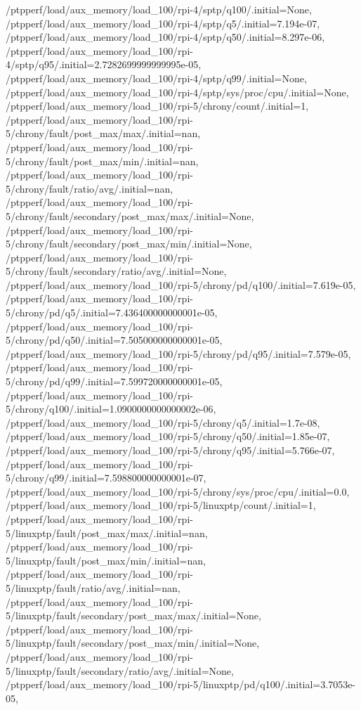 {    /ptpperf/load/aux_memory/load_100/rpi-4/sptp/q100/.initial=None,
    /ptpperf/load/aux_memory/load_100/rpi-4/sptp/q5/.initial=7.194e-07,
    /ptpperf/load/aux_memory/load_100/rpi-4/sptp/q50/.initial=8.297e-06,
    /ptpperf/load/aux_memory/load_100/rpi-4/sptp/q95/.initial=2.7282699999999995e-05,
    /ptpperf/load/aux_memory/load_100/rpi-4/sptp/q99/.initial=None,
    /ptpperf/load/aux_memory/load_100/rpi-4/sptp/sys/proc/cpu/.initial=None,
    /ptpperf/load/aux_memory/load_100/rpi-5/chrony/count/.initial=1,
    /ptpperf/load/aux_memory/load_100/rpi-5/chrony/fault/post_max/max/.initial=nan,
    /ptpperf/load/aux_memory/load_100/rpi-5/chrony/fault/post_max/min/.initial=nan,
    /ptpperf/load/aux_memory/load_100/rpi-5/chrony/fault/ratio/avg/.initial=nan,
    /ptpperf/load/aux_memory/load_100/rpi-5/chrony/fault/secondary/post_max/max/.initial=None,
    /ptpperf/load/aux_memory/load_100/rpi-5/chrony/fault/secondary/post_max/min/.initial=None,
    /ptpperf/load/aux_memory/load_100/rpi-5/chrony/fault/secondary/ratio/avg/.initial=None,
    /ptpperf/load/aux_memory/load_100/rpi-5/chrony/pd/q100/.initial=7.619e-05,
    /ptpperf/load/aux_memory/load_100/rpi-5/chrony/pd/q5/.initial=7.436400000000001e-05,
    /ptpperf/load/aux_memory/load_100/rpi-5/chrony/pd/q50/.initial=7.505000000000001e-05,
    /ptpperf/load/aux_memory/load_100/rpi-5/chrony/pd/q95/.initial=7.579e-05,
    /ptpperf/load/aux_memory/load_100/rpi-5/chrony/pd/q99/.initial=7.599720000000001e-05,
    /ptpperf/load/aux_memory/load_100/rpi-5/chrony/q100/.initial=1.0900000000000002e-06,
    /ptpperf/load/aux_memory/load_100/rpi-5/chrony/q5/.initial=1.7e-08,
    /ptpperf/load/aux_memory/load_100/rpi-5/chrony/q50/.initial=1.85e-07,
    /ptpperf/load/aux_memory/load_100/rpi-5/chrony/q95/.initial=5.766e-07,
    /ptpperf/load/aux_memory/load_100/rpi-5/chrony/q99/.initial=7.598800000000001e-07,
    /ptpperf/load/aux_memory/load_100/rpi-5/chrony/sys/proc/cpu/.initial=0.0,
    /ptpperf/load/aux_memory/load_100/rpi-5/linuxptp/count/.initial=1,
    /ptpperf/load/aux_memory/load_100/rpi-5/linuxptp/fault/post_max/max/.initial=nan,
    /ptpperf/load/aux_memory/load_100/rpi-5/linuxptp/fault/post_max/min/.initial=nan,
    /ptpperf/load/aux_memory/load_100/rpi-5/linuxptp/fault/ratio/avg/.initial=nan,
    /ptpperf/load/aux_memory/load_100/rpi-5/linuxptp/fault/secondary/post_max/max/.initial=None,
    /ptpperf/load/aux_memory/load_100/rpi-5/linuxptp/fault/secondary/post_max/min/.initial=None,
    /ptpperf/load/aux_memory/load_100/rpi-5/linuxptp/fault/secondary/ratio/avg/.initial=None,
    /ptpperf/load/aux_memory/load_100/rpi-5/linuxptp/pd/q100/.initial=3.7053e-05,
}

